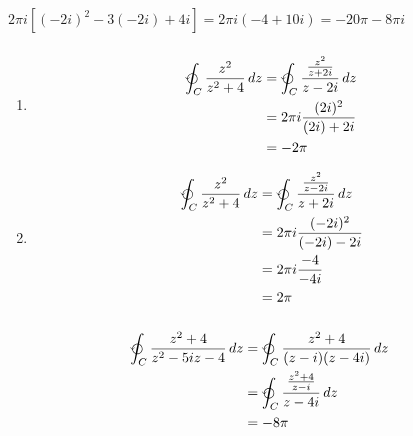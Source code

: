 \documentclass{article}
\begin{document}
$2 \pi i [(-2 i)^2 - 3 (-2 i) + 4 i] = 2 \pi i (-4 + 10 i) = -20 \pi - 8 \pi i$

\setcounter{subsubsection}{6}
\subsubsection{}

\begin{enumerate}
  \item


        \begin{align*}
          \varointctrclockwise_C \frac{z^2}{z^2 + 4} \,d z & = \varointctrclockwise_C \frac{\frac{z^2}{z + 2 i}}{z - 2 i} \,d z \\
                                                           & = 2 \pi i \frac{(2 i)^2}{(2 i) + 2 i}                              \\
                                                           & = -2 \pi
        \end{align*}

  \item

        \begin{align*}
          \varointctrclockwise_C \frac{z^2}{z^2 + 4} \,d z & = \varointctrclockwise_C \frac{\frac{z^2}{z - 2 i}}{z + 2 i} \,d z \\
                                                           & = 2 \pi i \frac{(-2 i)^2}{(-2 i) - 2 i}                            \\
                                                           & = 2 \pi i \frac{-4}{-4 i}                                          \\
                                                           & = 2 \pi
        \end{align*}
\end{enumerate}

\setcounter{subsubsection}{8}
\subsubsection{}

\begin{align*}
  \varointctrclockwise_C \frac{z^2 + 4}{z^2 - 5 i z - 4} \,d z & = \varointctrclockwise_C \frac{z^2 + 4}{(z - i) (z - 4 i)} \,d z     \\
                                                               & = \varointctrclockwise_C \frac{\frac{z^2 + 4}{z - i}}{z - 4 i} \,d z \\
                                                               & = -8 \pi
\end{align*}
\end{document}
